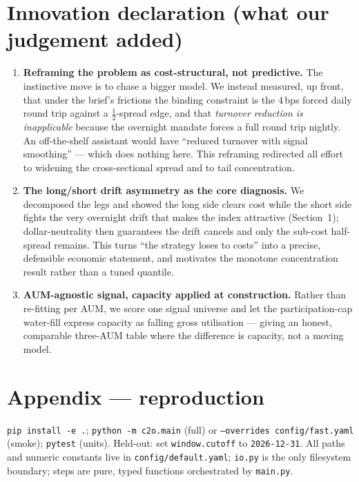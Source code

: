 \documentclass[11pt,a4paper]{article}
\newcommand{\code}[1]{\texttt{#1}}
\begin{document}
\section{Innovation declaration (what our judgement added)}
\begin{enumerate}
\item \textbf{Reframing the problem as cost-structural, not predictive.} The instinctive move is to chase a
bigger model. We instead measured, up front, that under the brief's frictions the binding constraint is the
$4$\,bps forced daily round trip against a $\tfrac12$-spread edge, and that \emph{turnover reduction is
inapplicable} because the overnight mandate forces a full round trip nightly. An off-the-shelf assistant would
have ``reduced turnover with signal smoothing'' --- which does nothing here. This reframing redirected all
effort to widening the cross-sectional spread and to tail concentration.
\item \textbf{The long/short drift asymmetry as the core diagnosis.} We decomposed the legs and showed the
long side clears cost while the short side fights the very overnight drift that makes the index attractive
(Section~1); dollar-neutrality then guarantees the drift cancels and only the sub-cost half-spread remains.
This turns ``the strategy loses to costs'' into a precise, defensible economic statement, and motivates the
monotone concentration result rather than a tuned quantile.
\item \textbf{AUM-agnostic signal, capacity applied at construction.} Rather than re-fitting per AUM, we score
one signal universe and let the participation-cap water-fill express capacity as falling gross utilisation ---
giving an honest, comparable three-AUM table where the difference is capacity, not a moving model.
\end{enumerate}

\section*{Appendix --- reproduction}
\code{pip install -e .}; \code{python -m c2o.main} (full) or \code{--overrides config/fast.yaml} (smoke);
\code{pytest} (units). Held-out: set \code{window.cutoff} to \code{2026-12-31}. All paths and numeric constants
live in \code{config/default.yaml}; \code{io.py} is the only filesystem boundary; steps are pure, typed
functions orchestrated by \code{main.py}.
\end{document}
